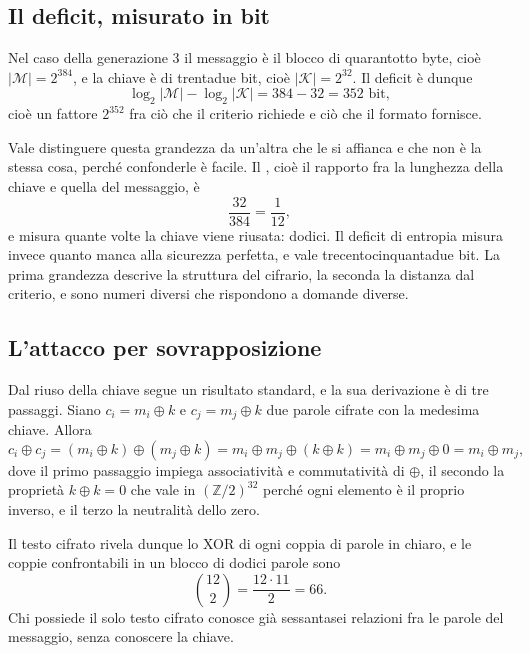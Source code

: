 \subsection{Il deficit, misurato in bit}

Nel caso della generazione 3 il messaggio è il blocco di quarantotto byte, cioè $|\mathcal{M}| = 2^{384}$, e la chiave è di trentadue bit, cioè $|\mathcal{K}| = 2^{32}$. Il deficit è dunque
\[
\log_2 |\mathcal{M}| - \log_2 |\mathcal{K}| = 384 - 32 = 352 \text{ bit},
\]
cioè un fattore $2^{352}$ fra ciò che il criterio richiede e ciò che il formato fornisce.

Vale distinguere questa grandezza da un'altra che le si affianca e che non è la stessa cosa, perché confonderle è facile. Il , cioè il rapporto fra la lunghezza della chiave e quella del messaggio, è
\[
\frac{32}{384} = \frac{1}{12},
\]
e misura quante volte la chiave viene riusata: dodici. Il deficit di entropia misura invece quanto manca alla sicurezza perfetta, e vale trecentocinquantadue bit. La prima grandezza descrive la struttura del cifrario, la seconda la distanza dal criterio, e sono numeri diversi che rispondono a domande diverse.

\subsection{L'attacco per sovrapposizione}

Dal riuso della chiave segue un risultato standard, e la sua derivazione è di tre passaggi. Siano $c_i = m_i \oplus k$ e $c_j = m_j \oplus k$ due parole cifrate con la medesima chiave. Allora
\[
c_i \oplus c_j = (m_i \oplus k) \oplus (m_j \oplus k)
= m_i \oplus m_j \oplus (k \oplus k)
= m_i \oplus m_j \oplus 0
= m_i \oplus m_j,
\]
dove il primo passaggio impiega associatività e commutatività di $\oplus$, il secondo la proprietà $k \oplus k = 0$ che vale in $(\mathbb{Z}/2)^{32}$ perché ogni elemento è il proprio inverso, e il terzo la neutralità dello zero.

Il testo cifrato rivela dunque lo XOR di ogni coppia di parole in chiaro, e le coppie confrontabili in un blocco di dodici parole sono
\[
\binom{12}{2} = \frac{12 \cdot 11}{2} = 66.
\]
Chi possiede il solo testo cifrato conosce già sessantasei relazioni fra le parole del messaggio, senza conoscere la chiave.

